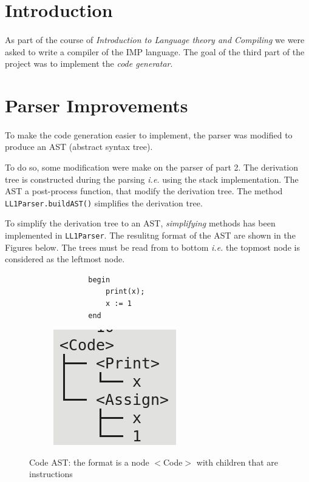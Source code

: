 \documentclass[letterpaper]{article}
\begin{document}
\section{Introduction}

\paragraph{}

As part of the course of \textit{Introduction to Language theory and Compiling}
we were asked to
write a compiler of the IMP language. The goal of the third part of the
project was to implement the \textit{code generatar}.

\section{Parser Improvements}

\paragraph{}

To make the code generation easier to implement, the parser was modified
to produce an AST (abstract syntax tree).

To do so, some modification were make on the parser of part 2. The
derivation tree is constructed during the parsing \textit{i.e.} using
the stack implementation. The AST a post-process function, that modify
the derivation tree. The method \texttt{LL1Parser.buildAST()} simplifies
the derivation tree.

To simplify the derivation tree to an AST, \textit{simplifying} methods
has been implemented in \texttt{LL1Parser}. The resulitng
format of the AST are shown in the Figures below.
The trees
must be read from to bottom \textit{i.e.} the topmost
node is considered as the leftmost node.


\begin{figure}[H]
    \begin{subfigure}{.5\textwidth}
        \begin{lstlisting}
        begin
            print(x);
            x := 1
        end
        \end{lstlisting}
    \end{subfigure}
    \begin{subfigure}{.5\textwidth}
    \includegraphics[scale=0.5]{image/code.png}
    \end{subfigure}
    \caption{Code AST: the format is a node $<$Code$>$ with children
    that are instructions}
\end{figure}
\end{document}
